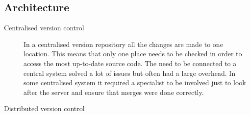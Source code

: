 % 

\subsection{Architecture}
\begin{description}

  \item [Centralised version control] 
  In a centralised version repository all the changes are made to one location.  This means that only one place needs to be checked in order to access the most up-to-date source code. The need to be connected to a central system solved a lot of issues but often had a large overhead.  In some centralised system it required a specialist to be involved just to look after the server and ensure that merges were done correctly.

  \item [Distributed version control] 
    


\end{description}
